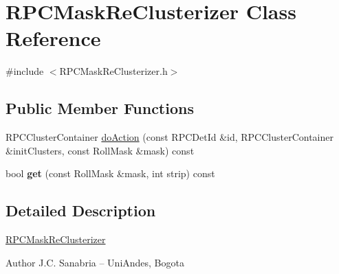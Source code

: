 \hypertarget{classRPCMaskReClusterizer}{\section{R\-P\-C\-Mask\-Re\-Clusterizer Class Reference}
\label{classRPCMaskReClusterizer}
}


{\ttfamily \#include $<$R\-P\-C\-Mask\-Re\-Clusterizer.\-h$>$}

\subsection*{Public Member Functions}
\begin{DoxyCompactItemize}
\item 
R\-P\-C\-Cluster\-Container \hyperlink{classRPCMaskReClusterizer_a1f1b432501f6fbb2796bb9007dd2a144}{do\-Action} (const R\-P\-C\-Det\-Id \&id, R\-P\-C\-Cluster\-Container \&init\-Clusters, const Roll\-Mask \&mask) const 
\item 
\hypertarget{classRPCMaskReClusterizer_abe133cd6b48982b7279e7c27b840467e}{bool {\bfseries get} (const Roll\-Mask \&mask, int strip) const }\label{classRPCMaskReClusterizer_abe133cd6b48982b7279e7c27b840467e}

\end{DoxyCompactItemize}


\subsection{Detailed Description}
\hyperlink{classRPCMaskReClusterizer}{R\-P\-C\-Mask\-Re\-Clusterizer} \begin{DoxyAuthor}{Author}
J.\-C. Sanabria -- Uni\-Andes, Bogota 
\end{DoxyAuthor}


